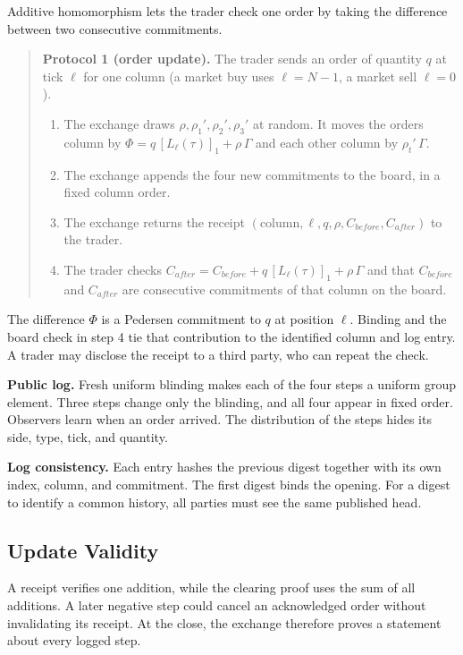 Additive homomorphism lets the trader check one order by taking the difference between two consecutive commitments.

\begin{quote}
\textbf{Protocol 1 (order update).} The trader sends an order of quantity \(q\) at tick \(\ell\) for one column (a market buy uses \(\ell = N-1\), a market sell \(\ell = 0\)).

\begin{enumerate}
\def\labelenumi{\arabic{enumi}.}
\item
  The exchange draws \(\rho, \rho_1', \rho_2', \rho_3'\) at random. It moves the order\textquotesingle s column by \(\Phi = q\,[L_\ell(\tau)]_1 + \rho\,\Gamma\) and each other column by \(\rho_t'\,\Gamma\).
\item
  The exchange appends the four new commitments to the board, in a fixed column order.
\item
  The exchange returns the receipt \((\text{column}, \ell, q, \rho, C_{before}, C_{after})\) to the trader.
\item
  The trader checks \(C_{after} = C_{before} + q\,[L_\ell(\tau)]_1 + \rho\,\Gamma\) and that \(C_{before}\) and \(C_{after}\) are consecutive commitments of that column on the board.
\end{enumerate}
\end{quote}

The difference \(\Phi\) is a Pedersen commitment \cite{pedersen1991} to \(q\) at position \(\ell\). Binding and the board check in step 4 tie that contribution to the identified column and log entry. A trader may disclose the receipt to a third party, who can repeat the check.

\textbf{Public log.} Fresh uniform blinding makes each of the four steps a uniform group element. Three steps change only the blinding, and all four appear in fixed order. Observers learn when an order arrived. The distribution of the steps hides its side, type, tick, and quantity.

\textbf{Log consistency.} Each entry hashes the previous digest together with its own index, column, and commitment. The first digest binds the opening. For a digest to identify a common history, all parties must see the same published head.

\subsection{Update Validity}

A receipt verifies one addition, while the clearing proof uses the sum of all additions. A later negative step could cancel an acknowledged order without invalidating its receipt. At the close, the exchange therefore proves a statement about every logged step.


